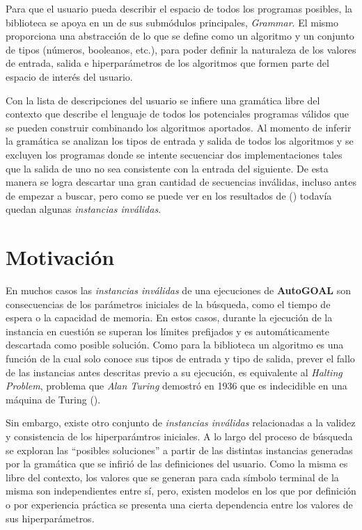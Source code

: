 Para que el usuario pueda describir el espacio de todos los programas posibles,
la biblioteca se apoya en un de sus submódulos principales, {\it Grammar}. El mismo
proporciona una abstracción de lo que se define como un algoritmo y un conjunto
de tipos (números, booleanos, etc.), para poder definir la naturaleza de los
valores de entrada, salida e hiperparámetros de los algoritmos que formen parte
del espacio de interés del usuario.

Con la lista de descripciones del usuario se infiere una gramática libre
del contexto que describe el lenguaje de todos los potenciales programas válidos
que se pueden construir combinando los algoritmos aportados. Al momento de inferir
la gramática se analizan los tipos de entrada y salida de todos los algoritmos y se
excluyen los programas donde se intente secuenciar dos implementaciones tales que
la salida de uno no sea consistente con la entrada del siguiente. De esta
manera se logra descartar una gran cantidad de secuencias inválidas, incluso
antes de empezar a buscar, pero como se puede ver en los resultados de (\cite{estevez-velarde-etal-2019-automl})
todavía quedan algunas {\it instancias inválidas}.

\section*{Motivación}

En muchos casos las {\it instancias inválidas} de una ejecuciones de {\bf AutoGOAL} son consecuencias de los
parámetros iniciales de la búsqueda, como el tiempo de espera o la capacidad de memoria.
En estos casos, durante la ejecución de la instancia en cuestión se superan los límites
prefijados y es automáticamente descartada como posible solución. Como para la
biblioteca un algoritmo es una función de la cual solo conoce sus tipos de entrada y
tipo de salida, prever el fallo de las instancias antes descritas previo a su ejecución,
es equivalente al {\it Halting Problem}, problema que {\it Alan Turing} demostró en 1936
que es indecidible en una máquina de Turing (\cite{Hopcroft+Ullman/79/Introduction}).

Sin embargo, existe otro conjunto de {\it instancias inválidas} relacionadas a la validez
y consistencia de los hiperparámtros iniciales. A lo largo del proceso de búsqueda
se exploran las ``posibles soluciones'' a partir de las distintas instancias generadas
por la gramática que se infirió de las definiciones del usuario. Como la misma
es libre del contexto, los valores que se generan para cada símbolo terminal de la misma
son independientes entre sí, pero, existen modelos en los que por definición o por
experiencia práctica se presenta una cierta dependencia entre los valores de sus
hiperparámetros.

